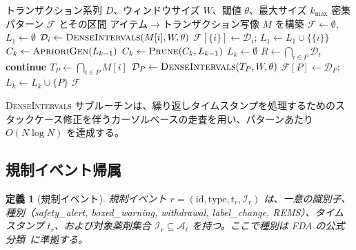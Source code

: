\documentclass[11pt]{article}
\newtheorem{definition}{定義}
\providecommand{\textsc}[1]{\textrm{\scshape #1}}
\begin{document}
\begin{algorithm}[htbp]
\caption{密集処方パターンマイニング}
\label{alg:dense_mining}
\begin{algorithmic}[1]
\Require トランザクション系列 $D$、ウィンドウサイズ $W$、閾値 $\theta$、最大サイズ $k_{\max}$
\Ensure 密集パターン $\mathcal{F}$ とその区間
\State アイテム$\to$トランザクション写像 $M$ を構築
\State $\mathcal{F} \gets \emptyset$, $L_1 \gets \emptyset$
    \State $\mathcal{D}_i \gets \textsc{DenseIntervals}(M[i], W, \theta)$
        \State $\mathcal{F}[\{i\}] \gets \mathcal{D}_i$; $L_1 \gets L_1 \cup \{\{i\}\}$
    \EndIf
\EndFor
{}
    \State $C_k \gets \textsc{AprioriGen}(L_{k-1})$
    \State $C_k \gets \textsc{Prune}(C_k, L_{k-1})$ 
    \State $L_k \gets \emptyset$
        \State $R \gets \bigcap_{i \in P} \mathcal{D}_i$ 
         \textbf{continue} \EndIf
        \State $T_P \gets \bigcap_{i \in P} M[i]$ 
        \State $\mathcal{D}_P \gets \textsc{DenseIntervals}(T_P, W, \theta)$
            \State $\mathcal{F}[P] \gets \mathcal{D}_P$; $L_k \gets L_k \cup \{P\}$
        \EndIf
    \EndFor
\EndFor
\State \Return $\mathcal{F}$
\end{algorithmic}
\end{algorithm}

\textsc{DenseIntervals} サブルーチンは、繰り返しタイムスタンプを処理するためのスタックケース修正を伴うカーソルベースの走査を用い、パターンあたり $O(N \log N)$ を達成する。

\subsection{規制イベント帰属}

\begin{definition}[規制イベント]\label{def:reg_event}
規制イベント $r = (\mathrm{id}, \mathrm{type}, t_r, \mathcal{I}_r)$ は、一意の識別子、種別（safety\_alert, boxed\_warning, withdrawal, label\_change, REMS）、タイムスタンプ $t_r$、および対象薬剤集合 $\mathcal{I}_r \subseteq \mathcal{A}_\ell$ を持つ。ここで種別は FDA の公式分類~\citep{dusetzina2012fda}に準拠する。
\end{definition}
\end{document}
